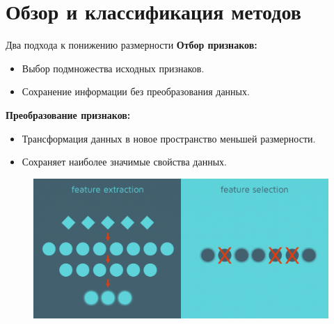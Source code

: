 \section{Обзор и классификация методов}

\begin{frame}{Два подхода к понижению размерности}
    \textbf{Отбор признаков:}
    \begin{itemize}
        \item Выбор подмножества исходных признаков.
        \item Сохранение информации без преобразования данных.
    \end{itemize}

    \textbf{Преобразование признаков:}
    \begin{itemize}
        \item Трансформация данных в новое пространство меньшей размерности.
        \item Сохраняет наиболее значимые свойства данных.
    \end{itemize}

    \begin{figure}
        \includegraphics[width=.5\textwidth]{../resources/methods/feature_selection_vs_extraction.png}
    \end{figure}
\end{frame}

